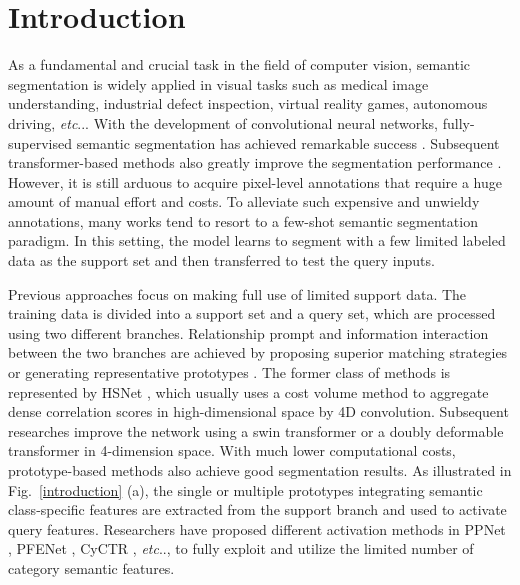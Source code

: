 \documentclass[letterpaper]{article} %
\makeatletter
\DeclareRobustCommand\onedot{\futurelet\@let@token\@onedot}
\def\@onedot{\ifx\@let@token.\else.\null\fi\xspace}
\def\etc{\emph{etc}\onedot} \def\vs{\emph{vs}\onedot}
\makeatother
\begin{document}
\section{Introduction}
As a fundamental and crucial task in the field of computer vision, semantic segmentation is widely applied in visual tasks such as medical image understanding, industrial defect inspection, virtual reality games, autonomous driving, \etc. With the development of convolutional neural networks, fully-supervised semantic segmentation has achieved remarkable success \cite{long2015fully}. Subsequent transformer-based methods also greatly improve the segmentation performance \cite{zhu2020deformable,xie2021segformer,yuan2021hrformer}. However, it is still arduous to acquire pixel-level annotations that require a huge amount of manual effort and costs. To alleviate such expensive and unwieldy annotations, many works tend to resort to a few-shot semantic segmentation paradigm. In this setting, the model learns to segment with a few limited labeled data as the support set and then transferred to test the query inputs.

Previous approaches \cite{shaban2017one,liu2020part} focus on making full use of limited support data. The training data is divided into a support set and a query set, which are processed using two different branches. Relationship prompt and information interaction between the two branches are achieved by proposing superior matching strategies \cite{kang2022integrative} or generating representative prototypes \cite{tian2020prior,wang2019panet,zhang2019canet,zhang2020sg}. The former class of methods is represented by HSNet \cite{min2021hypercorrelation}, which usually uses a cost volume method to aggregate dense correlation scores in high-dimensional space by 4D convolution. Subsequent researches improve the network using a swin transformer \cite{hong2022cost} or a doubly deformable transformer \cite{xiong2022doubly} in 4-dimension space. With much lower computational costs, prototype-based methods also achieve good segmentation results. As illustrated in Fig.~\ref{introduction} (a), the single or multiple prototypes integrating semantic class-specific features are extracted from the support branch and used to activate query features. Researchers have proposed different activation methods in PPNet \cite{liu2020part}, PFENet \cite{tian2020prior}, CyCTR \cite{zhang2021few}, \etc, to fully exploit and utilize the limited number of category semantic features.
\end{document}
